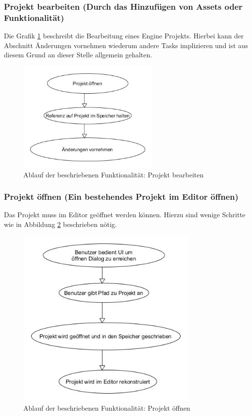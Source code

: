 \documentclass[pagesize, paper=a4, fontsize=12pt, titlepage=true, headings=small, headnosepline, abstractoff, liststotoc, nochapterprefix, plainheadsepline, twoside]{scrreprt}
\begin{document}
\subsubsection{Projekt bearbeiten (Durch das Hinzufügen von Assets oder Funktionalität)}
Die Grafik \ref{re:projektbearbeiten} beschreibt die Bearbeitung eines Engine Projekts. Hierbei kann der Abschnitt Änderungen vornehmen wiederum andere Tasks implizieren und ist aus diesem Grund an dieser Stelle allgemein gehalten.
\begin{figure}[ht]
	\centering
	\includegraphics[width=7cm]{Bilder/ProjektBearbeiten.jpg}
	\caption{Ablauf der beschriebenen Funktionalität: Projekt bearbeiten}
	\label{re:projektbearbeiten}
\end{figure}

\subsubsection{Projekt öffnen (Ein bestehendes Projekt im Editor öffnen)}
Das Projekt muss im Editor geöffnet werden können. Hierzu sind wenige Schritte wie in Abbildung \ref{re:projektöffnen} beschrieben nötig.
\begin{figure}[ht]
	\centering
	\includegraphics[width=9cm]{Bilder/ProjektOeffnen.jpg}
	\caption{Ablauf der beschriebenen Funktionalität: Projekt öffnen}
	\label{re:projektöffnen}
\end{figure}
\end{document}
